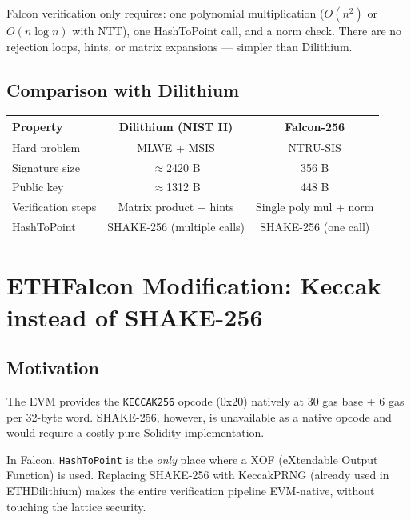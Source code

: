 \documentclass[11pt,a4paper]{article}
\begin{document}
\begin{infobox}
Falcon verification only requires: one polynomial multiplication ($O(n^2)$ or
$O(n\log n)$ with NTT), one HashToPoint call, and a norm check.
There are no rejection loops, hints, or matrix expansions --- simpler than Dilithium.
\end{infobox}

\subsection{Comparison with Dilithium}

\begin{center}
\begin{tabular}{lcc}
\toprule
Property & Dilithium (NIST II) & Falcon-256 \\
\midrule
Hard problem         & MLWE + MSIS       & NTRU-SIS \\
Signature size       & $\approx$2420 B   & 356 B \\
Public key           & $\approx$1312 B   & 448 B \\
Verification steps   & Matrix product + hints & Single poly mul + norm \\
HashToPoint          & SHAKE-256 (multiple calls) & SHAKE-256 (one call) \\
\bottomrule
\end{tabular}
\end{center}

\section{ETHFalcon Modification: Keccak instead of SHAKE-256}

\subsection{Motivation}

The EVM provides the \texttt{KECCAK256} opcode (0x20) natively at 30 gas base
+ 6 gas per 32-byte word. SHAKE-256, however, is unavailable as a native
opcode and would require a costly pure-Solidity implementation.

In Falcon, \texttt{HashToPoint} is the \emph{only} place where a
XOF (eXtendable Output Function) is used. Replacing SHAKE-256 with KeccakPRNG
(already used in ETHDilithium) makes the entire verification pipeline
EVM-native, without touching the lattice security.
\end{document}
